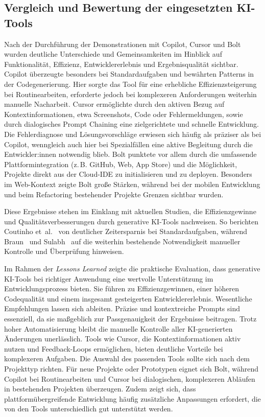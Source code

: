 \subsection{Vergleich und Bewertung der eingesetzten KI-Tools}
\label{sec:vergleich-bewertung}

Nach der Durchführung der Demonstrationen mit Copilot, Cursor und Bolt wurden
deutliche Unterschiede und Gemeinsamkeiten im Hinblick auf Funktionalität,
Effizienz, Entwicklererlebnis und Ergebnisqualität sichtbar. Copilot überzeugte
besonders bei Standardaufgaben und bewährten Patterns in der Codegenerierung.
Hier sorgte das Tool für eine erhebliche Effizienzsteigerung bei
Routinearbeiten, erforderte jedoch bei komplexeren Anforderungen weiterhin
manuelle Nacharbeit. Cursor ermöglichte durch den aktiven Bezug auf
Kontextinformationen, etwa Screenshots, Code oder Fehlermeldungen, sowie durch
dialogisches Prompt Chaining eine zielgerichtete und schnelle Entwicklung. Die
Fehlerdiagnose und Lösungsvorschläge erwiesen sich häufig als präziser als bei
Copilot, wenngleich auch hier bei Spezialfällen eine aktive Begleitung durch
die Entwickler:innen notwendig blieb. Bolt punktete vor allem durch die
umfassende Plattformintegration (z.\,B. GitHub, Web, App Store) und die
Möglichkeit, Projekte direkt aus der Cloud-IDE zu initialisieren und zu
deployen. Besonders im Web-Kontext zeigte Bolt große Stärken, während bei der
mobilen Entwicklung und beim Refactoring bestehender Projekte Grenzen sichtbar
wurden.

Diese Ergebnisse stehen im Einklang mit aktuellen Studien, die Effizienzgewinne
und Qualitätsverbesserungen durch generative KI-Tools nachweisen. So berichten
Coutinho et~al.~\cite{coutinho_role_2024} von deutlicher Zeitersparnis bei
Standardaufgaben, während Braun~\cite{braun_ki_2024} und
Sulabh~\cite{s_future_2024} auf die weiterhin bestehende Notwendigkeit
manueller Kontrolle und Überprüfung hinweisen.

Im Rahmen der \textit{Lessons Learned} zeigte die praktische Evaluation, dass
generative KI-Tools bei richtiger Anwendung eine wertvolle Unterstützung im
Entwicklungsprozess bieten. Sie führen zu Effizienzgewinnen, einer höheren
Codequalität und einem insgesamt gesteigerten Entwicklererlebnis. Wesentliche
Empfehlungen lassen sich ableiten. Präzise und kontextreiche Prompts sind
essenziell, da sie maßgeblich zur Passgenauigkeit der Ergebnisse beitragen.
Trotz hoher Automatisierung bleibt die manuelle Kontrolle aller KI-generierten
Änderungen unerlässlich. Tools wie Cursor, die Kontextinformationen aktiv
nutzen und Feedback-Loops ermöglichen, bieten deutliche Vorteile bei
komplexeren Aufgaben. Die Auswahl des passenden Tools sollte sich nach dem
Projekttyp richten. Für neue Projekte oder Prototypen eignet sich Bolt, während
Copilot bei Routinearbeiten und Cursor bei dialogischen, komplexeren Abläufen
in bestehenden Projekten überzeugen. Zudem zeigt sich, dass
plattformübergreifende Entwicklung häufig zusätzliche Anpassungen erfordert,
die von den Tools unterschiedlich gut unterstützt werden.


